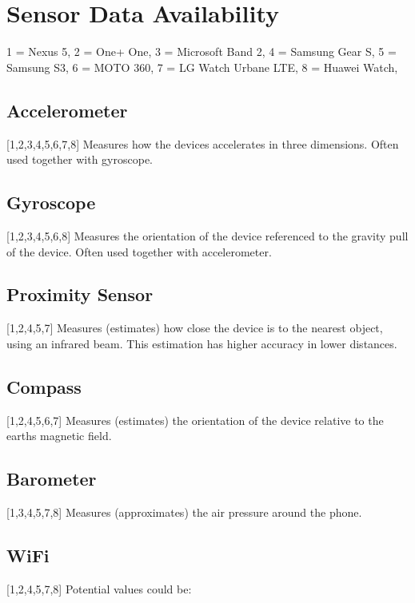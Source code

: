 
\section{Sensor Data Availability}
\label{sec:sensor_data_availability}

1 = Nexus 5,
2 = One+ One,
3 = Microsoft Band 2,
4 = Samsung Gear S,
5 = Samsung S3,
6 = MOTO 360,
7 = LG Watch Urbane LTE,
8 = Huawei Watch,


\subsection{Accelerometer}
\label{sub:accelerometer}
[1,2,3,4,5,6,7,8]
Measures how the devices accelerates in three dimensions. Often used together with gyroscope.

\subsection{Gyroscope}
\label{sub:gyroscope}
[1,2,3,4,5,6,8]
Measures the orientation of the device referenced to the gravity pull of the device. Often used together with accelerometer.

\subsection{Proximity Sensor}
\label{sub:proximity_sensor}
[1,2,4,5,7]
Measures (estimates) how close the device is to the nearest object, using an infrared beam. This estimation has higher accuracy in lower distances.

\subsection{Compass}
\label{sub:compass}
[1,2,4,5,6,7]
Measures (estimates) the orientation of the device relative to the earths magnetic field.

\subsection{Barometer}
\label{sub:barometer}
[1,3,4,5,7,8]
Measures (approximates) the air pressure around the phone.

\subsection{WiFi}
\label{sub:wifi}
[1,2,4,5,7,8]
Potential values could be: 

